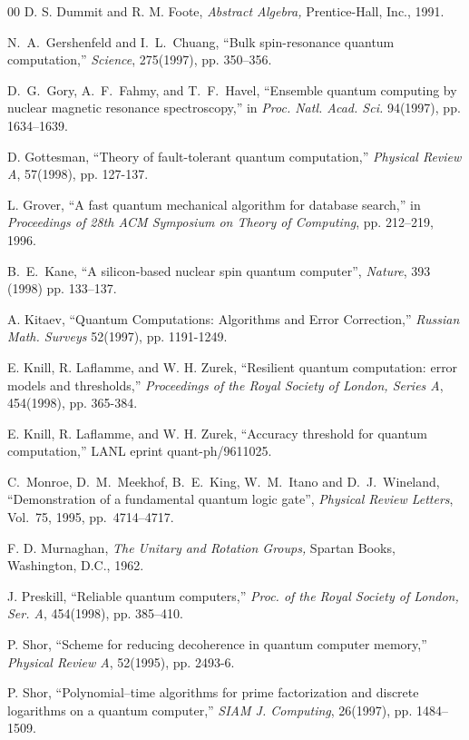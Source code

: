 \documentclass[twocolumn,11pt]{article}
\begin{document}
\begin{thebibliography}{00}
 D. S. Dummit and R. M. Foote, {\it Abstract
Algebra,}  Prentice-Hall, Inc., 1991.

N.~A.~Gershenfeld and I.~L.~Chuang, ``Bulk spin-resonance quantum computation,''
{\em Science}, 275(1997), pp. 350--356.

 D.~G.~Gory, A.~F.~Fahmy, and T.~F.~Havel, ``Ensemble quantum computing
by nuclear magnetic resonance spectroscopy,'' in {\em Proc. Natl. Acad. Sci.} 
94(1997), pp. 1634--1639.

 D. Gottesman,  
``Theory of fault-tolerant quantum computation,''
{\em Physical Review A}, 57(1998), pp. 127-137.

 L. Grover, ``A fast quantum mechanical algorithm for
database search,'' in {\em Proceedings of 28th ACM Symposium on Theory
of Computing}, pp. 212--219, 1996. 

 B.~E.~Kane,
``A silicon-based nuclear spin quantum computer'',
{\em Nature}, 393 (1998) pp. 133--137.

 A. Kitaev, ``Quantum Computations: Algorithms
and Error Correction,'' {\em Russian Math. Surveys} 52(1997), pp. 1191-1249.

E. Knill, R. Laflamme, and W. H. Zurek, 
``Resilient quantum computation: error models and thresholds,''  
{\em Proceedings of the Royal Society of London, Series A}, 454(1998), pp.
365-384.

E. Knill, R. Laflamme, and W. H. Zurek,
``Accuracy threshold for quantum computation,'' LANL eprint quant-ph/9611025.

C.~Monroe, D.~M.~Meekhof, B.~E.~King, W.~M.~Itano and D.~J.~Wineland,
``Demonstration of a fundamental quantum logic gate'',
{\em Physical Review Letters}, Vol.~75, 1995, pp.~4714--4717.

 F. D. Murnaghan, {\it The Unitary and Rotation
Groups,}  Spartan Books, Washington, D.C., 1962.

J. Preskill, ``Reliable quantum computers,'' {\em Proc. of the Royal Society of 
London, Ser. A},  454(1998), pp. 385--410.

 P. Shor,
``Scheme for reducing decoherence in quantum computer memory,''    
{\em Physical Review A}, 52(1995), pp. 2493-6.

 P. Shor, ``Polynomial--time algorithms for prime
factorization and discrete logarithms on a quantum computer,'' {\em SIAM
J. Computing}, 26(1997), pp. 1484--1509.  


\end{thebibliography}
\end{document}
